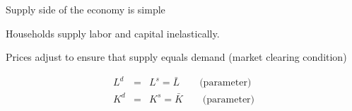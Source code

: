 \documentclass[notes,11pt, aspectratio=169, xcolor=table]{beamer}
\newenvironment{wideitemize}{\itemize\addtolength{\itemsep}{10pt}}{\enditemize}
\begin{document}
\begin{frame}{Supply side of the economy is simple}

\begin{wideitemize}
    \item Households supply labor and capital inelastically.
    \item Prices adjust to ensure that supply equals demand (market clearing condition) 
\end{wideitemize}


  \begin{eqnarray*}
     L^d &=& L^s = \bar{L} \qquad \text{(parameter)} \\
     K^d &=& K^s = \bar{K} \qquad \text{(parameter)}
  \end{eqnarray*}

\end{frame}
\end{document}
